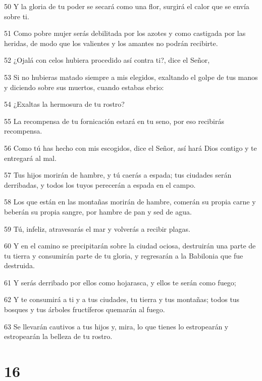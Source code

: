 \par 50 Y la gloria de tu poder se secará como una flor, surgirá el calor que se envía sobre ti.
\par 51 Como pobre mujer serás debilitada por los azotes y como castigada por las heridas, de modo que los valientes y los amantes no podrán recibirte.
\par 52 ¿Ojalá con celos hubiera procedido así contra ti?, dice el Señor,
\par 53 Si no hubieras matado siempre a mis elegidos, exaltando el golpe de tus manos y diciendo sobre sus muertos, cuando estabas ebrio:
\par 54 ¿Exaltas la hermosura de tu rostro?
\par 55 La recompensa de tu fornicación estará en tu seno, por eso recibirás recompensa.
\par 56 Como tú has hecho con mis escogidos, dice el Señor, así hará Dios contigo y te entregará al mal.
\par 57 Tus hijos morirán de hambre, y tú caerás a espada; tus ciudades serán derribadas, y todos los tuyos perecerán a espada en el campo.
\par 58 Los que están en las montañas morirán de hambre, comerán su propia carne y beberán su propia sangre, por hambre de pan y sed de agua.
\par 59 Tú, infeliz, atravesarás el mar y volverás a recibir plagas.
\par 60 Y en el camino se precipitarán sobre la ciudad ociosa, destruirán una parte de tu tierra y consumirán parte de tu gloria, y regresarán a la Babilonia que fue destruida.
\par 61 Y serás derribado por ellos como hojarasca, y ellos te serán como fuego;
\par 62 Y te consumirá a ti y a tus ciudades, tu tierra y tus montañas; todos tus bosques y tus árboles fructíferos quemarán al fuego.
\par 63 Se llevarán cautivos a tus hijos y, mira, lo que tienes lo estropearán y estropearán la belleza de tu rostro.

\chapter{16}

